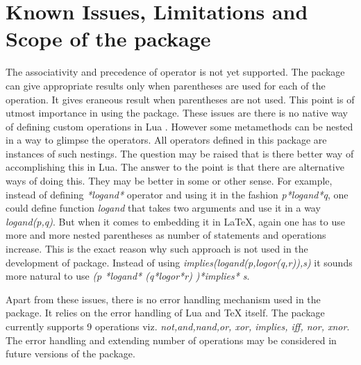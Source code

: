 \documentclass{article}
\begin{document}
\section{Known Issues, Limitations and Scope of the package} The associativity and precedence of operator is not yet supported. The package can give appropriate results only when parentheses are used for each of the operation. It gives eraneous result when  parentheses are not used. This point is of utmost importance in using the package. These issues are there is no native way of defining custom operations in Lua \cite{online.luacustomoperator}. However some metamethods can be nested in a way to glimpse the operators. All operators defined in this package are instances of such nestings. The question may be raised that is there better way of accomplishing this in Lua. The answer to the point is that there are alternative ways of doing this. They may be better in some or other sense. For example, instead of defining \emph{*logand*} operator and using it in the fashion \emph{p*logand*q}, one could define function \emph{logand} that takes two arguments and use it in a way \emph{logand(p,q)}. But when it comes to embedding it in LaTeX, again one has to use more and more nested parentheses as number of statements and operations increase. This is the exact reason why such approach is not used in the development of package. Instead of using \emph{implies(logand(p,logor(q,r)),s)} it sounds more natural to use \emph{(p *logand* (q*logor*r) )*implies* s}. 

Apart from these issues, there is no error handling mechanism used in the package. It relies on the error handling of Lua and TeX itself. The package currently supports 9 operations viz. \emph{not,and,nand,or, xor, implies, iff, nor, xnor}. The error handling and extending number of operations may be considered in future versions of the package. 

\printbibliography
\end{document}
